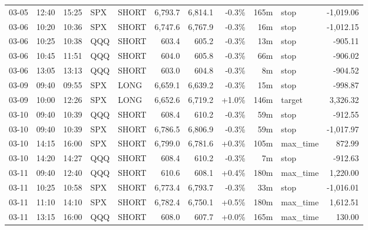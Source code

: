 \documentclass[11pt,a4paper,twoside]{article}
\begin{document}
\begin{center}
\begin{longtable}{>{\color{txtmain}}l l l l l r r r r >{\color{txtmain}}l r}
03-05 & 12:40 & 15:25 & SPX & SHORT & 6,793.7 & 6,814.1 & \textcolor{lossred}{-0.3\%} & 165m & stop & \textcolor{lossred}{-1,019.06} \\
03-06 & 10:20 & 10:36 & SPX & SHORT & 6,747.6 & 6,767.9 & \textcolor{lossred}{-0.3\%} & 16m & stop & \textcolor{lossred}{-1,012.15} \\
03-06 & 10:25 & 10:38 & QQQ & SHORT & 603.4 & 605.2 & \textcolor{lossred}{-0.3\%} & 13m & stop & \textcolor{lossred}{-905.11} \\
03-06 & 10:45 & 11:51 & QQQ & SHORT & 604.0 & 605.8 & \textcolor{lossred}{-0.3\%} & 66m & stop & \textcolor{lossred}{-906.02} \\
03-06 & 13:05 & 13:13 & QQQ & SHORT & 603.0 & 604.8 & \textcolor{lossred}{-0.3\%} & 8m & stop & \textcolor{lossred}{-904.52} \\
03-09 & 09:40 & 09:55 & SPX & LONG & 6,659.1 & 6,639.2 & \textcolor{lossred}{-0.3\%} & 15m & stop & \textcolor{lossred}{-998.87} \\
03-09 & 10:00 & 12:26 & SPX & LONG & 6,652.6 & 6,719.2 & \textcolor{wingreen}{+1.0\%} & 146m & target & \textcolor{wingreen}{3,326.32} \\
03-10 & 09:40 & 10:39 & QQQ & SHORT & 608.4 & 610.2 & \textcolor{lossred}{-0.3\%} & 59m & stop & \textcolor{lossred}{-912.55} \\
03-10 & 09:40 & 10:39 & SPX & SHORT & 6,786.5 & 6,806.9 & \textcolor{lossred}{-0.3\%} & 59m & stop & \textcolor{lossred}{-1,017.97} \\
03-10 & 14:15 & 16:00 & SPX & SHORT & 6,799.0 & 6,781.6 & \textcolor{wingreen}{+0.3\%} & 105m & max\_time & \textcolor{wingreen}{872.99} \\
03-10 & 14:20 & 14:27 & QQQ & SHORT & 608.4 & 610.2 & \textcolor{lossred}{-0.3\%} & 7m & stop & \textcolor{lossred}{-912.63} \\
03-11 & 09:40 & 12:40 & QQQ & SHORT & 610.6 & 608.1 & \textcolor{wingreen}{+0.4\%} & 180m & max\_time & \textcolor{wingreen}{1,220.00} \\
03-11 & 10:25 & 10:58 & SPX & SHORT & 6,773.4 & 6,793.7 & \textcolor{lossred}{-0.3\%} & 33m & stop & \textcolor{lossred}{-1,016.01} \\
03-11 & 11:10 & 14:10 & SPX & SHORT & 6,782.4 & 6,750.1 & \textcolor{wingreen}{+0.5\%} & 180m & max\_time & \textcolor{wingreen}{1,612.51} \\
03-11 & 13:15 & 16:00 & QQQ & SHORT & 608.0 & 607.7 & \textcolor{wingreen}{+0.0\%} & 165m & max\_time & \textcolor{wingreen}{130.00} \\

\end{longtable}
\end{center}
\end{document}
